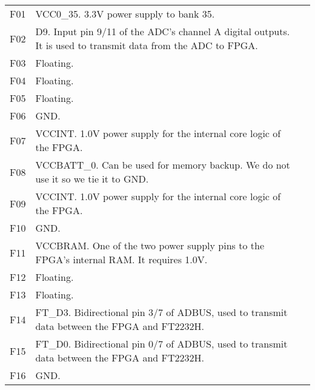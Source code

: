 \begin{tabularx}{\textwidth}{c X>{\raggedright\arraybackslash}X}
        F01 & VCC0\_35. 3.3V power supply to bank 35. \\
        F02 & D9. Input pin 9/11 of the ADC's channel A digital outputs. It is used to transmit data from
        the ADC to FPGA. \\
        F03 & Floating. \\
        F04 & Floating. \\
        F05 & Floating. \\
        F06 & GND\@. \\
        F07 & VCCINT. 1.0V power supply for the internal core logic of the FPGA. \\
        F08 & VCCBATT\_0. Can be used for memory backup. We do not use it so we tie it to GND\@. \\
        F09 & VCCINT. 1.0V power supply for the internal core logic of the FPGA. \\
        F10 & GND\@. \\
        F11 & VCCBRAM. One of the two power supply pins to the FPGA's internal RAM. It requires 1.0V. \\
        F12 & Floating. \\
        F13 & Floating. \\
        F14 & FT\_D3. Bidirectional pin 3/7 of ADBUS, used to transmit data between the FPGA and
        FT2232H. \\
        F15 & FT\_D0. Bidirectional pin 0/7 of ADBUS, used to transmit data between the FPGA and
        FT2232H. \\
        F16 & GND\@. \\

        \midrule


\end{tabularx}
